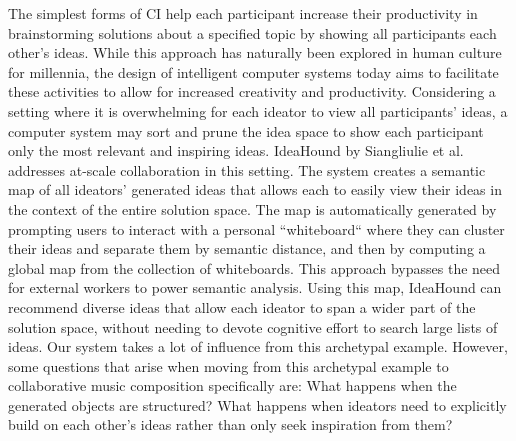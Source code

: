 \documentclass[final,authoryear,11pt,times]{elsarticle}
\begin{document}
The simplest forms of CI help each participant increase their productivity in brainstorming solutions about a specified topic by showing all participants each other's ideas. While this approach has naturally been explored in human culture for millennia, the design of intelligent computer systems today aims to facilitate these activities to allow for increased creativity and productivity. Considering a setting where it is overwhelming for each ideator to view all participants' ideas, a computer system may sort and prune the idea space to show each participant only the most relevant and inspiring ideas. IdeaHound by Siangliulie et al. addresses at-scale collaboration in this setting. The system creates a semantic map of all ideators' generated ideas that allows each to easily view their ideas in the context of the entire solution space. The map is automatically generated by prompting users to interact with a personal ``whiteboard`` where they can cluster their ideas and separate them by semantic distance, and then by computing a global map from the collection of whiteboards. This approach bypasses the need for external workers to power semantic analysis.  Using this map, IdeaHound can recommend diverse ideas that allow each ideator to span a wider part of the solution space, without needing to devote cognitive effort to search large lists of ideas. Our system takes a lot of influence from this archetypal example. However, some questions that arise when moving from this archetypal example to collaborative music composition specifically are: What happens when the generated objects are structured? What happens when ideators need to explicitly build on each other's ideas rather than only seek inspiration from them?
\end{document}
